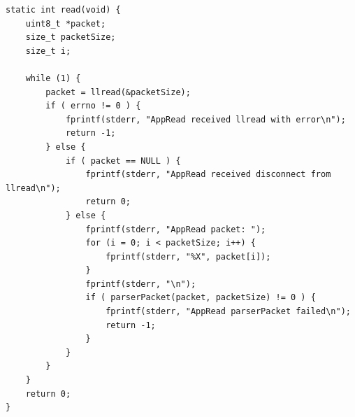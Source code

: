 \documentclass[a4paper]{article}
\begin{document}
\begin{verbatim}
static int read(void) {
    uint8_t *packet;
    size_t packetSize;
    size_t i;

    while (1) {
        packet = llread(&packetSize);
        if ( errno != 0 ) {
            fprintf(stderr, "AppRead received llread with error\n");
            return -1;
        } else {
            if ( packet == NULL ) {
                fprintf(stderr, "AppRead received disconnect from llread\n");
                return 0;
            } else {
                fprintf(stderr, "AppRead packet: ");
                for (i = 0; i < packetSize; i++) {
                    fprintf(stderr, "%X", packet[i]);
                }
                fprintf(stderr, "\n");
                if ( parserPacket(packet, packetSize) != 0 ) {
                    fprintf(stderr, "AppRead parserPacket failed\n");
                    return -1;
                }
            }
        }
    }
    return 0;
}
\end{verbatim}
\end{document}
